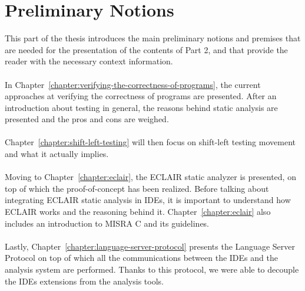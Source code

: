 \documentclass[12pt, a4paper, twoside]{book}
\let\origdoublepage\cleardoublepage
\newcommand{\clearemptydoublepage}{%
	\clearpage
	{\pagestyle{empty}\origdoublepage}%
}
\let\cleardoublepage\clearemptydoublepage
\begin{document}


\cleardoublepage



\cleardoublepage



\cleardoublepage

\pagestyle{plain}
\tableofcontents
%

\listoffigures    %
%
%
%

%

\pagestyle{fancy}

\part{Preliminary Notions}\label{part:preliminary-notions}
This part of the thesis introduces the main preliminary notions and premises that are needed for the presentation of the contents of Part 2, and that provide the reader with the necessary context information.
\\\\
In Chapter~\ref{chapter:verifying-the-correctness-of-programs}, the current approaches at verifying the correctness of programs are presented. After an introduction about testing in general, the reasons behind static analysis are presented and the pros and cons are weighed. 
\\\\
Chapter~\ref{chapter:shift-left-testing} will then focus on shift-left testing movement and what it actually implies.
\\\\
Moving to Chapter~\ref{chapter:eclair}, the ECLAIR static analyzer is presented, on top of which the proof-of-concept has been realized. Before talking about integrating ECLAIR static analysis in IDEs, it is important to understand how ECLAIR works and the reasoning behind it. Chapter~\ref{chapter:eclair} also includes an introduction to MISRA C and its guidelines.
\\\\
Lastly, Chapter~\ref{chapter:language-server-protocol} presents the Language Server Protocol on top of which all the communications between the IDEs and the analysis system are performed. Thanks to this protocol, we were able to decouple the IDEs extensions from the analysis tools.




\end{document}
